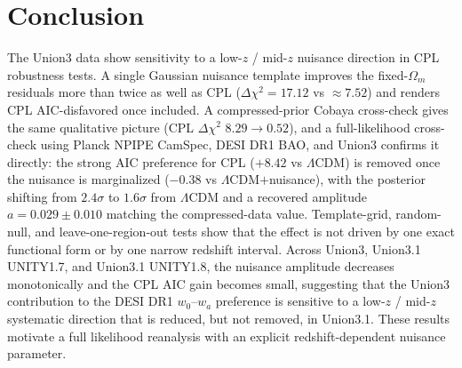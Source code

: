 \documentclass[11pt]{article}
\begin{document}
\section{Conclusion}

The Union3 data show sensitivity to a low-$z$ / mid-$z$ nuisance direction in CPL
robustness tests. A single Gaussian nuisance template improves the fixed-$\Omega_m$
residuals more than twice as well as CPL ($\Delta\chi^2=17.12$ vs $\approx7.52$) and
renders CPL AIC-disfavored once included. A compressed-prior Cobaya cross-check gives
the same qualitative picture (CPL $\Delta\chi^2$ $8.29\to0.52$), and a full-likelihood
cross-check using Planck NPIPE CamSpec, DESI DR1 BAO, and Union3 confirms it directly:
the strong AIC preference for CPL ($+8.42$ vs $\Lambda$CDM) is removed once the nuisance
is marginalized ($-0.38$ vs $\Lambda$CDM$+$nuisance), with the posterior shifting from
$2.4\sigma$ to $1.6\sigma$ from $\Lambda$CDM and a recovered amplitude
$a=0.029\pm0.010$ matching the compressed-data value. Template-grid, random-null, and
leave-one-region-out tests show that the effect is not driven by one exact functional
form or by one narrow redshift interval. Across Union3, Union3.1 UNITY1.7, and Union3.1
UNITY1.8, the nuisance amplitude decreases monotonically and the CPL AIC gain becomes
small, suggesting that the Union3 contribution to the DESI DR1 $w_0$--$w_a$ preference
is sensitive to a low-$z$ / mid-$z$ systematic direction that is reduced, but not
removed, in Union3.1. These results motivate a full likelihood reanalysis with an
explicit redshift-dependent nuisance parameter.
\end{document}
